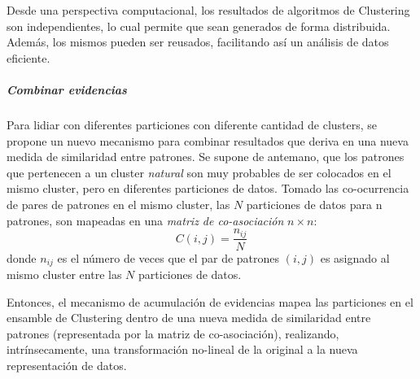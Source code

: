 \bigskip Desde una perspectiva computacional, los resultados de algoritmos de Clustering son independientes, lo cual permite que sean generados de forma distribuida. Además, los mismos pueden ser reusados, facilitando así un análisis de datos eficiente.

\subparagraph{Combinar evidencias}
Para lidiar con diferentes particiones con diferente cantidad de clusters, se propone un nuevo mecanismo para combinar resultados que deriva en una nueva medida de similaridad entre patrones. Se supone de antemano, que los patrones que pertenecen a un cluster \textit{natural} son muy probables de ser colocados en el mismo cluster, pero en diferentes particiones de datos. Tomado las co-ocurrencia de pares de patrones en el mismo cluster, las \(N\) particiones de datos para n patrones, son mapeadas en una \textit{matriz de co-asociación} \(n \times n\):
\[C(i,j)=\frac{n_{ij}}{N}\]
donde \(n_{ij}\) es el número de veces que el par de patrones \((i,j)\) es asignado al mismo cluster entre las \(N\) particiones de datos.

\bigskip Entonces, el mecanismo de acumulación de evidencias mapea las particiones en el ensamble de Clustering dentro de una nueva medida de similaridad entre patrones (representada por la matriz de co-asociación), realizando, intrínsecamente, una transformación no-lineal de la original a la nueva representación de datos.
